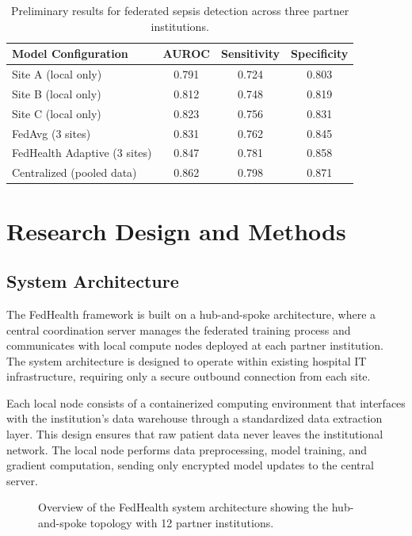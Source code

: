 \documentclass[12pt,letterpaper]{article}
\begin{document}
\begin{table}[H]
\centering
\caption{Preliminary results for federated sepsis detection across three partner institutions.}
\label{tab:prelim}
\begin{tabular}{lccc}
\hline
\textbf{Model Configuration} & \textbf{AUROC} & \textbf{Sensitivity} & \textbf{Specificity} \\
\hline
Site A (local only) & 0.791 & 0.724 & 0.803 \\
Site B (local only) & 0.812 & 0.748 & 0.819 \\
Site C (local only) & 0.823 & 0.756 & 0.831 \\
FedAvg (3 sites) & 0.831 & 0.762 & 0.845 \\
FedHealth Adaptive (3 sites) & 0.847 & 0.781 & 0.858 \\
Centralized (pooled data) & 0.862 & 0.798 & 0.871 \\
\hline
\end{tabular}
\end{table}

\section{Research Design and Methods}
\label{sec:methods}

\subsection{System Architecture}

The FedHealth framework is built on a hub-and-spoke architecture, where a central coordination server manages the federated training process and communicates with local compute nodes deployed at each partner institution. The system architecture is designed to operate within existing hospital IT infrastructure, requiring only a secure outbound connection from each site.

Each local node consists of a containerized computing environment that interfaces with the institution's data warehouse through a standardized data extraction layer. This design ensures that raw patient data never leaves the institutional network. The local node performs data preprocessing, model training, and gradient computation, sending only encrypted model updates to the central server.

\begin{figure}[H]
\centering
{}
\caption{Overview of the FedHealth system architecture showing the hub-and-spoke topology with 12 partner institutions.}
\label{fig:architecture}
\end{figure}
\end{document}
